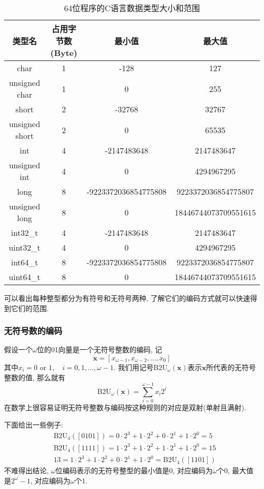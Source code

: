 \documentclass[utf8]{ctexart} %
\begin{document}
\begin{table}[h!]
	\begin{center}
		\begin{tabular}{c|c|c|c}
			\textbf{类型名} & \textbf{占用字节数(Byte)} & \textbf{最小值} & \textbf{最大值} \\
			\hline
			char & 1 & -128 & 127\\
			\hline
			unsigned char & 1 & 0 & 255\\
			\hline
			short & 2 & -32768 & 32767\\
			\hline
			unsigned short & 2 & 0 & 65535\\
			\hline
			int & 4 & -2147483648 & 2147483647\\
			\hline
			unsigned int & 4 & 0 & 4294967295\\
			\hline
			long & 8 & -9223372036854775808 & 9223372036854775807\\
			\hline
			unsigned long & 8 & 0 & 18446744073709551615\\
			\hline
			int32\_t & 4 & -2147483648 & 2147483647\\
			\hline
			uint32\_t & 4 & 0 & 4294967295\\
			\hline
			int64\_t & 8 & -9223372036854775808 & 9223372036854775807\\
			\hline
			uint64\_t & 8 & 0 & 18446744073709551615\\
			\hline
		\end{tabular}
	\caption{64位程序的C语言数据类型大小和范围}
	\end{center}
\end{table}
可以看出每种整型都分为有符号和无符号两种, 了解它们的编码方式就可以快速得到它们的范围.
\subsubsection{无符号数的编码}
假设一个$\omega$位的01向量是一个无符号整数的编码, 记$$\boldsymbol{x}=[x_{\omega-1},x_{\omega-2},\dots,x_0]$$
其中$x_i=0\text{ or }1,\quad i=0,1,\dots,\omega-1$. 我们用记号$\mathrm{B2U}_{\omega}(\boldsymbol{x})$表示$\boldsymbol{x}$所代表的无符号整数的值, 那么就有
$$\mathrm{B2U}_{\omega}(\boldsymbol{x})=\sum_{i=0}^{\omega-1}x_i2^i$$
在数学上很容易证明无符号整数与编码按这种规则的对应是双射(单射且满射). \par 
下面给出一些例子:
$$\begin{aligned}
&\mathrm{B2U}_{4}([0101])=0\cdot2^3+1\cdot2^2+0\cdot2^1+1\cdot2^0 = 5\\
&\mathrm{B2U}_{4}([1111])=1\cdot2^3+1\cdot2^2+1\cdot2^1+1\cdot2^0 = 15\\
&13=1\cdot2^3+1\cdot2^2+0\cdot2^1+1\cdot2^0 =\mathrm{B2U}_{4}([1101])
\end{aligned}$$
不难得出结论, $\omega$位编码表示的无符号整型的最小值是0, 对应编码为$\omega$个0,  最大值是$2^{\omega}-1$, 对应编码为$\omega$个1.
\end{document}
